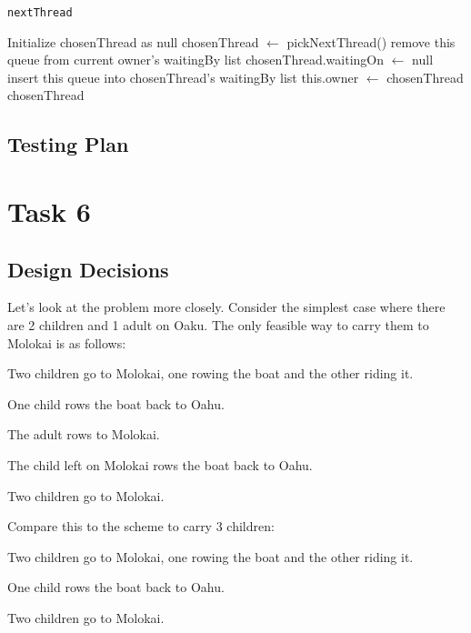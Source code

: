 \documentclass{article}
\begin{document}
\begin{spacing}{1.1}
\begin{algorithm}
  \caption{\texttt{nextThread}}
\begin{algorithmic}[1]
  \STATE Initialize chosenThread as null
  \STATE chosenThread $\leftarrow$ pickNextThread()
    \STATE remove this queue from current owner's waitingBy list
    \STATE chosenThread.waitingOn $\leftarrow$ null
    \STATE insert this queue into chosenThread's waitingBy list
  \ENDIF
  \STATE this.owner $\leftarrow$ chosenThread
\RETURN chosenThread
\end{algorithmic}
\end{algorithm}

\subsection{Testing Plan}

\section{Task 6}

\subsection{Design Decisions}
Let's look at the problem more closely. Consider the simplest case where there are 2 children and 1 adult on Oaku. The only feasible way to carry them to Molokai is as follows:
\begin{asparaitem}
  \item Two children go to Molokai, one rowing the boat and the other riding it.\\
  \item One child rows the boat back to Oahu.\\
  \item The adult rows to Molokai.\\
  \item The child left on Molokai rows the boat back to Oahu.\\
  \item Two children go to Molokai.\\
\end{asparaitem}

Compare this to the scheme to carry 3 children:
\begin{asparaitem}
  \item Two children go to Molokai, one rowing the boat and the other riding it.\\
  \item One child rows the boat back to Oahu.\\
  \item Two children go to Molokai.\\
\end{asparaitem}


\end{spacing}
\end{document}
